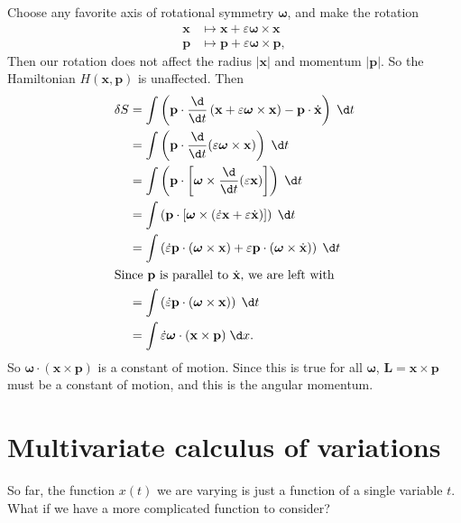 \documentclass[a4paper]{article}
\begin{document}
\begin{eg}
\begin{enumerate}
      Choose any favorite axis of rotational symmetry $\boldsymbol\omega$, and make the rotation
      \begin{align*}
        \mathbf{x}&\mapsto \mathbf{x} + \varepsilon\boldsymbol\omega\times \mathbf{x}\\
        \mathbf{p}&\mapsto \mathbf{p} + \varepsilon\boldsymbol\omega\times \mathbf{p},
      \end{align*}
      Then our rotation does not affect the radius $|\mathbf{x}|$ and momentum $|\mathbf{p}|$. So the Hamiltonian $H(\mathbf{x}, \mathbf{p})$ is unaffected. Then
      \begin{align*}
        \delta S &= \int \left(\mathbf{p}\cdot \frac{\d}{\d t}\left(\mathbf{x} + \varepsilon\boldsymbol\omega \times \mathbf{x}\right) - \mathbf{p}\cdot \dot{\mathbf{x}}\right)\;\d t\\
        &= \int \left(\mathbf{p}\cdot \frac{\d}{\d t}(\varepsilon\boldsymbol\omega\times \mathbf{x})\right)\;\d t\\
        &= \int \left(\mathbf{p}\cdot \left[\boldsymbol\omega\times \frac{\d}{\d t}(\varepsilon\mathbf{x})\right]\right)\;\d t\\
        &= \int \left(\mathbf{p}\cdot \left[\boldsymbol\omega\times (\dot{\varepsilon} \mathbf{x} + \varepsilon \dot{\mathbf{x}})\right]\right)\;\d t\\
        &= \int \left(\dot{\varepsilon}\mathbf{p}\cdot (\boldsymbol\omega\times \mathbf{x}) + \varepsilon \mathbf{p}\cdot (\boldsymbol\omega \times \dot{\mathbf{x}})\right)\;\d t\\
        \intertext{Since $\mathbf{p}$ is parallel to $\dot{\mathbf{x}}$, we are left with}
        &= \int \left(\dot{\varepsilon}\mathbf{p}\cdot (\boldsymbol\omega\times \mathbf{x})\right)\;\d t\\
        &= \int \dot{\varepsilon}\boldsymbol\omega\cdot (\mathbf{x}\times \mathbf{p})\;\d x.
      \end{align*}
      So $\boldsymbol\omega\cdot (\mathbf{x}\times \mathbf{p})$ is a constant of motion. Since this is true for all $\boldsymbol\omega$, $\mathbf{L} = \mathbf{x}\times \mathbf{p}$ must be a constant of motion, and this is the angular momentum.
  \end{enumerate}
\end{eg}
\section{Multivariate calculus of variations}
So far, the function $x(t)$ we are varying is just a function of a single variable $t$. What if we have a more complicated function to consider?
\end{document}
